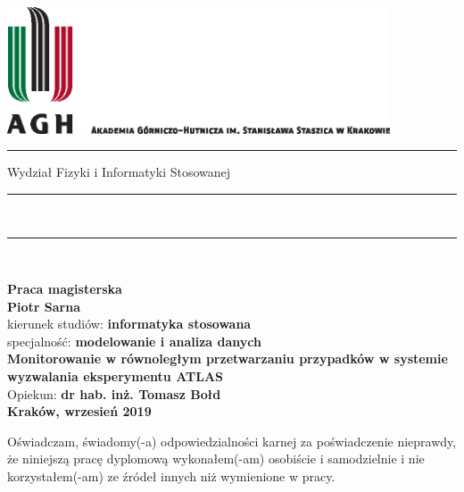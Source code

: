 \thispagestyle{empty}
\includegraphics[height=37.5mm]{img/agh_nzw_a_pl_1w_wbr_cmyk}\\
\rule{30mm}{0pt}
{\large \textsf{Wydział Fizyki i Informatyki Stosowanej}}\\
\rule{\textwidth}{3pt}\\
\rule[2ex]
{\textwidth}{1pt}\\
\vspace{7ex}
\begin{center}
{\LARGE \bf \textsf{Praca magisterska}}\\
\vspace{13ex}
{\bf \Large \textsf{Piotr Sarna}}\\
\vspace{3ex}
{\sf\small kierunek studiów:} {\bf\small \textsf{informatyka stosowana}}\\
\vspace{1.5ex}
{\sf\small specjalność:} {\bf\small \textsf{modelowanie i analiza danych}}\\
\vspace{10ex}
{\bf \huge \textsf{Monitorowanie w równoległym przetwarzaniu przypadków w systemie wyzwalania eksperymentu ATLAS}}\\
\vspace{14ex}
{\Large Opiekun: \bf \textsf{dr hab. inż. Tomasz Bołd}}\\
\vspace{22ex}
{\large \bf \textsf{Kraków, wrzesień 2019}}
\end{center}

\newpage

{\sf Oświadczam, świadomy(-a) odpowiedzialności karnej za poświadczenie nieprawdy, że niniejszą pracę dyplomową wykonałem(-am) osobiście i samodzielnie i  nie korzystałem(-am) ze źródeł innych niż wymienione w pracy.}

